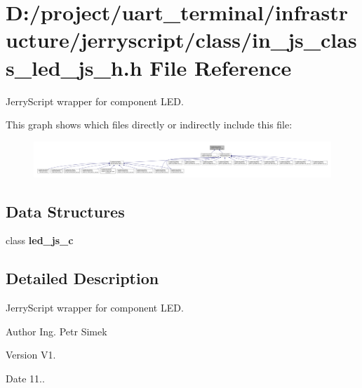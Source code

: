\section{D\+:/project/uart\+\_\+terminal/infrastructure/jerryscript/class/in\+\_\+js\+\_\+class\+\_\+led\+\_\+js\+\_\+h.h File Reference}
\label{in__js__class__led__js__h_8h}


Jerry\+Script wrapper for component L\+ED.  


This graph shows which files directly or indirectly include this file\+:
\nopagebreak
\begin{figure}[H]
\begin{center}
\leavevmode
\includegraphics[width=350pt]{in__js__class__led__js__h_8h__dep__incl}
\end{center}
\end{figure}
\subsection*{Data Structures}
\begin{DoxyCompactItemize}
\item 
class \textbf{ led\+\_\+js\+\_\+c}
\end{DoxyCompactItemize}


\subsection{Detailed Description}
Jerry\+Script wrapper for component L\+ED. 

\begin{DoxyAuthor}{Author}
Ing. Petr Simek 
\end{DoxyAuthor}
\begin{DoxyVersion}{Version}
V1. 
\end{DoxyVersion}
\begin{DoxyDate}{Date}
11.. 
\end{DoxyDate}
